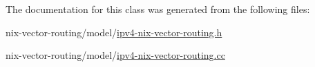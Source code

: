 The documentation for this class was generated from the following files\+:\begin{DoxyCompactItemize}
\item 
nix-\/vector-\/routing/model/\hyperlink{ipv4-nix-vector-routing_8h}{ipv4-\/nix-\/vector-\/routing.\+h}\item 
nix-\/vector-\/routing/model/\hyperlink{ipv4-nix-vector-routing_8cc}{ipv4-\/nix-\/vector-\/routing.\+cc}\end{DoxyCompactItemize}
